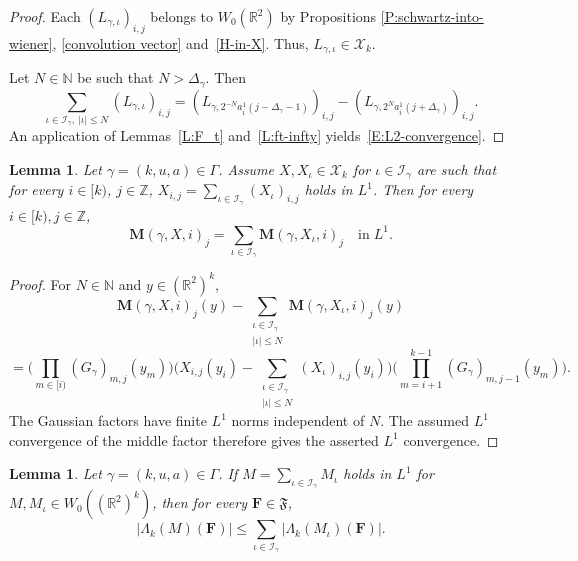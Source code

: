 \documentclass[12pt,reqno]{amsart}
\theoremstyle{plain}
\newtheorem{lemma}[theorem]{Lemma}
\numberwithin{equation}{section}
\theoremstyle{remark}
\newcommand{\using}[1]{}
\newcommand{\Z}{{\mathbb Z}}
\newcommand{\R}{{\mathbb R}}
\newcommand{\N}{{\mathbb N}}
\begin{document}
\begin{proof}
Each
$(L_{\gamma,\iota})_{i,j}$ belongs to $W_0(\R^2)$ by Propositions \ref{P:schwartz-into-wiener}, \ref{convolution vector} and~\ref{H-in-X}. Thus, $L_{\gamma,\iota}\in \mathcal{X}_k$.

Let $N\in \N$ be such that $N>\Delta_\gamma$. Then
\[
\sum_{\iota \in\mathcal{I}_{\gamma}, ~|\iota| \leq N} (L_{\gamma,\iota})_{i,j}
=(L_{\gamma,2^{-N} a_i^1(j-\Delta_\gamma-1)})_{i,j}-(L_{\gamma,2^{N} a_i^1(j+\Delta_\gamma)})_{i,j}.
\]
An application of Lemmas~\ref{L:F_t} and~\ref{L:ft-infty} yields~\eqref{E:L2-convergence}.
\end{proof}

\begin{lemma}\label{sandwich sums L1}
Let $\gamma=(k,u,a)\in \Gamma$.
Assume $X, X_\iota\in \mathcal{X}_k$ for $\iota\in \mathcal{I}_{\gamma}$ are such that for every $i\in [k)$, $j\in\Z$, $X_{i,j}=\sum_{\iota\in \mathcal{I}_{\gamma}} (X_\iota)_{i,j}$ holds in $L^1$.
Then for every $i\in [k), j\in\Z$,
\begin{equation}\label{auto:H-kernel-L-decomposition} \mathbf{M}(\gamma,X,i)_j = \sum_{\iota\in \mathcal{I}_{\gamma}} \mathbf{M}(\gamma,X_\iota,i)_j\quad\text{in}\;L^1.\end{equation}
\end{lemma}

\begin{proof}
For $N\in\N$ and $y\in(\R^2)^k$,
\[
\mathbf M(\gamma,X,i)_j(y)-
\sum_{\substack{\iota\in\mathcal I_\gamma\\|\iota|\le N}}
\mathbf M(\gamma,X_\iota,i)_j(y)
\]
\[
=
\Big(\prod_{m\in[i)}(G_\gamma)_{m,j}(y_m)\Big)
\Big(X_{i,j}(y_i)-
\sum_{\substack{\iota\in\mathcal I_\gamma\\|\iota|\le N}}
(X_\iota)_{i,j}(y_i)\Big)
\Big(\prod_{m=i+1}^{k-1}(G_\gamma)_{m,j-1}(y_m)\Big).
\]
The Gaussian factors have finite $L^1$ norms independent of $N$. The assumed $L^1$ convergence of the middle factor therefore gives the asserted $L^1$ convergence.
\end{proof}


\begin{lemma}\label{prism sum le sum prism-L1}\using{prism BL inequality}\using{M to K}
Let $\gamma=(k,u,a)\in \Gamma$.
If $M=\sum_{\iota\in \mathcal{I}_\gamma} M_\iota$ holds in $L^1$ for $M,M_\iota\in W_0((\R^2)^k)$, then for every $\mathbf{F}\in\mathfrak{F}$,
\begin{equation}\label{auto:prism-form-series-bound} |\Lambda_k(M)(\mathbf{F})| \le \sum_{\iota\in \mathcal{I}_\gamma} |\Lambda_k(M_\iota)(\mathbf{F})|. \end{equation}
\end{lemma}
\end{document}
